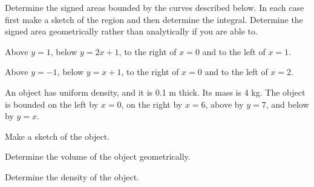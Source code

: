 \begin{problem}
\item Determine the signed areas bounded by the curves described
  below. In each case first make a sketch of the region and then
  determine the integral. Determine the signed area geometrically
  rather than analytically if you are able to.
  \begin{subproblem}
  \item Above $y=1$, below $y=2x+1$, to the right of $x=0$ and to the
    left of $x=1$.
    \vfill
  \item Above $y=-1$, below $y=x+1$, to the right of $x=0$ and to the
    left of $x=2$.
    \vfill
  \end{subproblem}

\clearpage

\item An object has uniform density, and it is 0.1 m thick. Its mass
  is 4 kg. The object is bounded on the left by $x=0$, on the right by
  $x=6$, above by $y=7$, and below by $y=x$.
  \begin{subproblem}
    \item Make a sketch of the object.
      \vfill
    \item Determine the volume of the object geometrically.
      \vfill
    \item Determine the density of the object.
      \vfill
  \end{subproblem}


\end{problem}



